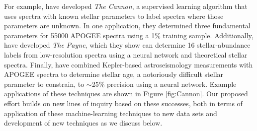 \documentclass[oneside,11pt]{amsart}
\begin{document}
For example, \citet{2015ApJ...808...16N} have developed {\it The
Cannon}, a supervised learning algorithm that uses spectra with known
stellar parameters to label spectra where those parameters are unknown.
In one application, they determined three fundamental parameters for
55000 APOGEE spectra using a 1\% training sample.  Additionally,
\citet{2018arXiv180401530T} have developed {\it The Payne}, which they
show can determine 16 stellar-abundance labels from low-resolution
spectra using a neural network and theoretical stellar spectra.
Finally, \citet{2018arXiv180803278T} have combined Kepler-based
astroseismology measurements with APOGEE spectra to determine stellar
age, a notoriously difficult stellar parameter to constrain, to
$\sim$25\% precision using a neural network.  Example applications of
these techniques are shown in Figure \ref{fig:Cannon}.  Our proposed
effort builds on new lines of inquiry based on these successes, both in
terms of application of these machine-learning techniques to new data
sets and development of new techniques as we discuss below.
\end{document}
